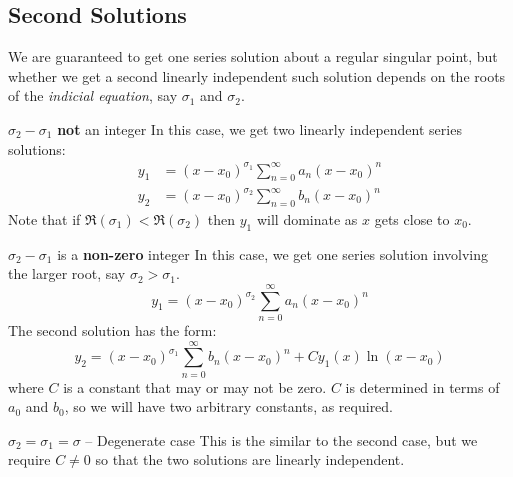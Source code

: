 \documentclass[../main.tex]{subfiles}
\begin{document}
\subsection{Second Solutions}
We are guaranteed to get one series solution about a regular singular point, but whether we get a second linearly independent such solution depends on the roots of the \textit{indicial equation}, say $\sigma_1$ and $\sigma_2$.
\begin{proofcases}
  \begin{case}{$\sigma_2 - \sigma_1$ \textbf{not} an integer}
    In this case, we get two linearly independent series solutions:
    \begin{align*}
      y_1 &= (x - x_0)^{\sigma_1}\sum_{n=0}^{\infty} a_n (x - x_0)^{n} \\
      y_2 &= (x - x_0)^{\sigma_2}\sum_{n=0}^{\infty} b_n (x - x_0)^{n}
    \end{align*}
    Note that if $\Re(\sigma_1) < \Re(\sigma_2)$ then $y_1$ will dominate as $x$ gets close to $x_0$.
  \end{case}
  \begin{case}{$\sigma_2 - \sigma_1$ is a \textbf{non-zero} integer}
    In this case, we get one series solution involving the larger root, say $\sigma_2 > \sigma_1$.
    \[
      y_1 = (x - x_0)^{\sigma_2}\sum_{n=0}^{\infty} a_n (x - x_0)^{n}
    \]
    The second solution has the form:
    \[
      y_2 = (x - x_0)^{\sigma_1}\sum_{n=0}^{\infty} b_n(x - x_0)^{n} + Cy_1(x)\ln(x - x_0)
    \]
    where $C$ is a constant that may or may not be zero.
    $C$ is determined in terms of $a_0$ and $b_0$, so we will have two arbitrary constants, as required.
  \end{case}
  \begin{case}{$\sigma_2 = \sigma_1 = \sigma$ -- Degenerate case}
    This is the similar to the second case, but we require $C \neq 0$ so that the two solutions are linearly independent.
  \end{case}
\end{proofcases}
\end{document}
